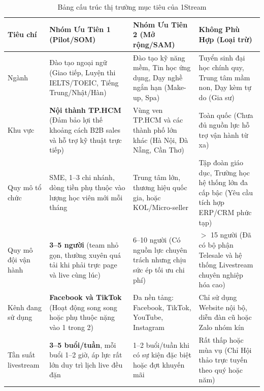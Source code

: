 \begin{table}[H]
    \centering
    \footnotesize
    \setlength{\tabcolsep}{3pt}
    \renewcommand{\arraystretch}{1.25}
    \caption{Bảng cấu trúc thị trường mục tiêu của 1Stream}
    \label{tab:bang-cau-truc-thi-truong-muc-tieu}
    \begin{tabularx}{\linewidth}{@{}L{1.6cm}YYY@{}}
        \toprule
        \textbf{Tiêu chí} &
        \textbf{Nhóm Ưu Tiên 1 (Pilot/SOM)} &
        \textbf{Nhóm Ưu Tiên 2 (Mở rộng/SAM)} &
        \textbf{Không Phù Hợp (Loại trừ)} \\ \midrule

        Ngành &
        Đào tạo ngoại ngữ (Giao tiếp, Luyện thi IELTS/TOEIC, Tiếng Trung/Nhật/Hàn) &
        Đào tạo kỹ năng mềm, Tin học ứng dụng, Dạy nghề ngắn hạn (Make-up, Spa) &
        Tuyển sinh đại học chính quy, Trung tâm mầm non, Dạy kèm tự do (Gia sư) \\

        Khu vực &
        \textbf{Nội thành TP.HCM} (Đảm bảo lợi thế khoảng cách B2B sales và hỗ trợ kỹ thuật trực tiếp) &
        Vùng ven TP.HCM và các thành phố lớn khác (Hà Nội, Đà Nẵng, Cần Thơ) &
        Toàn quốc (Chưa đủ nguồn lực hỗ trợ vận hành từ xa) \\

        Quy mô tổ chức &
        SME, 1--3 chi nhánh, dòng tiền phụ thuộc vào lượng học viên mới mỗi tháng &
        Trung tâm lớn, thương hiệu quốc gia, hoặc KOL/Micro-seller &
        Tập đoàn giáo dục, Trường học hệ thống lớn đa cấp bậc (Yêu cầu tích hợp ERP/CRM phức tạp) \\

        Quy mô đội vận hành &
        \textbf{3--5 người} (team nhỏ gọn, thường xuyên quá tải khi phải trực page và live cùng lúc) &
        6--10 người (Có nguồn lực chuyên trách nhưng chịu sức ép tối ưu chi phí) &
        $>$ 15 người (Đã có bộ phận Telesale và hệ thống Livestream chuyên nghiệp hóa cao) \\

        Kênh đang sử dụng &
        \textbf{Facebook và TikTok} (Hoạt động song song hoặc phụ thuộc nặng vào 1 trong 2) &
        Đa nền tảng: Facebook, TikTok, YouTube, Instagram &
        Chỉ sử dụng Website nội bộ, diễn đàn cũ hoặc Zalo nhóm kín \\

        Tần suất livestream &
        \textbf{3--5 buổi/tuần}, mỗi buổi 1--2 giờ, áp lực rất lớn duy trì lịch live đều đặn &
        1--2 buổi/tuần khi có sự kiện đặc biệt hoặc đợt khuyến mãi &
        Rất thấp hoặc mùa vụ (Chỉ Hội thảo trực tuyến theo quý hoặc năm) \\


\end{tabularx}
\end{table}

